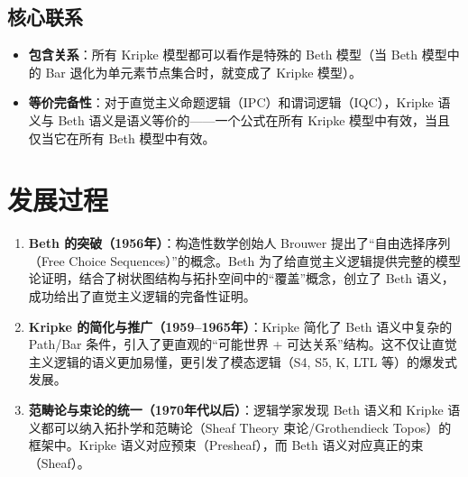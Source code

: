 \documentclass[UTF8,a4paper,11pt]{ctexart}
\begin{document}
\subsection{核心联系}

\begin{itemize}[leftmargin=2em]
  \item \textbf{包含关系}：所有 Kripke 模型都可以看作是特殊的 Beth 模型（当 Beth 模型中的 Bar 退化为单元素节点集合时，就变成了 Kripke 模型）。
  \item \textbf{等价完备性}：对于直觉主义命题逻辑（IPC）和谓词逻辑（IQC），Kripke 语义与 Beth 语义是语义等价的——一个公式在所有 Kripke 模型中有效，当且仅当它在所有 Beth 模型中有效。
\end{itemize}

\section{发展过程}

\begin{center}
\end{center}

\begin{enumerate}[leftmargin=2em]
  \item \textbf{Beth 的突破（1956年）}：构造性数学创始人 Brouwer 提出了“自由选择序列（Free Choice Sequences）”的概念。Beth 为了给直觉主义逻辑提供完整的模型论证明，结合了树状图结构与拓扑空间中的“覆盖”概念，创立了 Beth 语义，成功给出了直觉主义逻辑的完备性证明。

  \item \textbf{Kripke 的简化与推广（1959--1965年）}：Kripke 简化了 Beth 语义中复杂的 Path/Bar 条件，引入了更直观的“可能世界 + 可达关系”结构。这不仅让直觉主义逻辑的语义更加易懂，更引发了模态逻辑（S4, S5, K, LTL 等）的爆发式发展。

  \item \textbf{范畴论与束论的统一（1970年代以后）}：逻辑学家发现 Beth 语义和 Kripke 语义都可以纳入拓扑学和范畴论（Sheaf Theory 束论/Grothendieck Topos）的框架中。Kripke 语义对应预束（Presheaf），而 Beth 语义对应真正的束（Sheaf）。
\end{enumerate}
\end{document}
